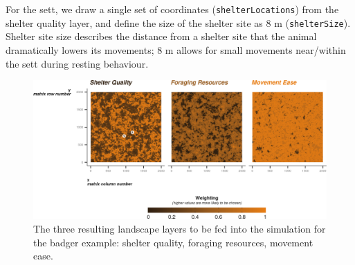 \documentclass[10pt,a4paper]{article}
\newenvironment{Shaded}{}{}
\newcommand{\AttributeTok}[1]{#1}
\newcommand{\ConstantTok}[1]{#1}
\newcommand{\DecValTok}[1]{#1}
\newcommand{\FloatTok}[1]{#1}
\newcommand{\FunctionTok}[1]{#1}
\newcommand{\NormalTok}[1]{#1}
\newcommand{\OtherTok}[1]{#1}
\newcommand{\SpecialCharTok}[1]{#1}
\newcommand{\StringTok}[1]{#1}
\begin{document}
\begin{Shaded}
\end{Shaded}

For the sett, we draw a single set of coordinates (\texttt{shelterLocations}) from the shelter quality layer, and define the size of the shelter site as 8 m (\texttt{shelterSize}).
Shelter site size describes the distance from a shelter site that the animal dramatically lowers its movements; 8 m allows for small movements near/within the sett during resting behaviour.

\begin{figure}

{\centering \includegraphics{Agent-based_model_walkthrough_files/figure-latex/BADGERlayersFigure-1} 

}

\caption{The three resulting landscape layers to be fed into the simulation for the badger example: shelter quality, foraging resources, movement ease.}\label{fig:BADGERlayersFigure}
\end{figure}
\end{document}
